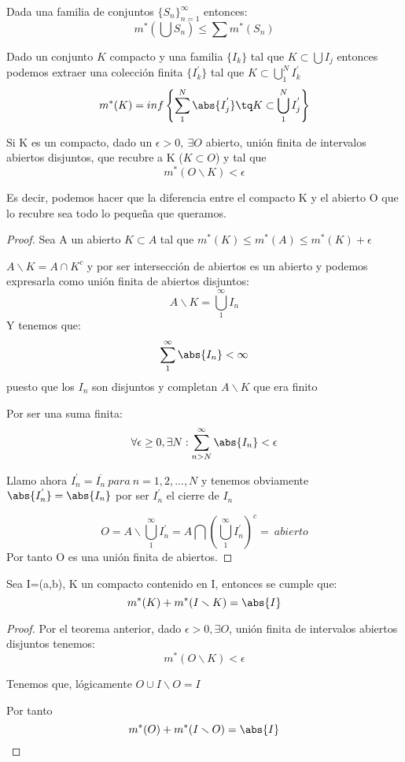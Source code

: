 \documentclass{apuntes}
\begin{document}
Dada una familia de conjuntos $\lbrace S_n\rbrace_{n=1}^{\infty}$  entonces:
\[m^*(\bigcup S_n) \leq \sum m^*(S_n)\]


\begin{defn}
Dado un conjunto $K$ compacto y una familia $\lbrace I_k \rbrace$ tal que $K \subset \bigcup I_j$ entonces podemos extraer una colección finita $\lbrace I_k^{'} \rbrace$ tal que $K \subset \bigcup_1^N I_k^{'}$
\[m^*(K) = inf\left\{\sum_1^N \abs{I_j^{'}} \tq K\subset \bigcup_1^N I_j^{'} \right\}\]
\end{defn}

\begin{theorem}
Si K es un compacto, dado un $\epsilon > 0, \ \exists O$ abierto, unión finita de intervalos abiertos disjuntos, que recubre a K ($K\subset O$) y tal que 
\[m^*(O\smallsetminus K) < \epsilon\]

Es decir, podemos hacer que la diferencia entre el compacto K y el abierto O que lo recubre sea todo lo pequeña que queramos.
\end{theorem}

\begin{proof}
Sea A un abierto $K \subset A$ tal que $m^*(K) \leq m^*(A) \leq m^*(K) + \epsilon$

$A \smallsetminus K = A \cap K^c$ y por ser intersección de abiertos es un abierto y podemos expresarla como unión finita de abiertos disjuntos:
\[A \smallsetminus K = \bigcup_1^{\infty} I_n\]
Y tenemos que:
\[\sum_1^{\infty}\abs{I_n} < \infty\]
puesto que los $I_n$ son disjuntos y completan $A \smallsetminus K$ que era finito

Por ser una suma finita:
\[ \forall \epsilon \ge 0,  \exists N : \sum_{n > N}^{\infty}\abs{I_n} < \epsilon\]

Llamo ahora $I_n^{'}=\overline{I_n} \ para \ n=1,2,...,N$ y tenemos obviamente $\abs{I_n^{'}}=\abs{I_n}$ por ser $I_n^{'}$ el cierre de $I_n$

\[O=A \smallsetminus \bigcup_1^{\infty}I_n^{'}= A \bigcap (\bigcup_1^{\infty}I_n^{'})^c = \ abierto \]
Por tanto O es una unión finita de abiertos.
\end{proof}


\begin{theorem}
Sea I=(a,b), K un compacto contenido en I, entonces se cumple que:
\[m^*(K)+m^*(I \smallsetminus K) = \abs{I}\]
\end{theorem}

\begin{proof}
Por el teorema anterior, dado $\epsilon > 0, \exists O$, unión finita de intervalos abiertos disjuntos tenemos:
\[m^*(O \smallsetminus K) < \epsilon\]

Tenemos que, lógicamente $O \cup I \smallsetminus O = I$

Por tanto
\[m^*(O)+m^*(I \smallsetminus O) = \abs{I}\]

\end{proof}
\end{document}
